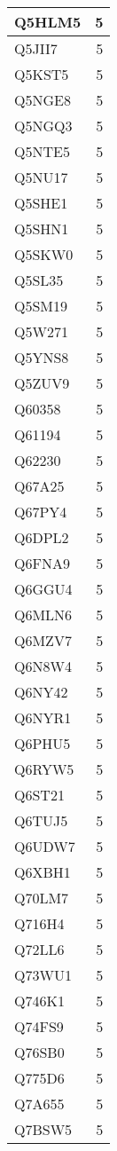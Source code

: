 \documentclass[
]{book}
\theoremstyle{definition}
\theoremstyle{definition}
\theoremstyle{definition}
\theoremstyle{definition}
\theoremstyle{remark}
\begin{document}
\begin{table}
\begin{tabular}{l|r}
\hline
Q5HLM5 & 5\\
\hline
Q5JII7 & 5\\
\hline
Q5KST5 & 5\\
\hline
Q5NGE8 & 5\\
\hline
Q5NGQ3 & 5\\
\hline
Q5NTE5 & 5\\
\hline
Q5NU17 & 5\\
\hline
Q5SHE1 & 5\\
\hline
Q5SHN1 & 5\\
\hline
Q5SKW0 & 5\\
\hline
Q5SL35 & 5\\
\hline
Q5SM19 & 5\\
\hline
Q5W271 & 5\\
\hline
Q5YNS8 & 5\\
\hline
Q5ZUV9 & 5\\
\hline
Q60358 & 5\\
\hline
Q61194 & 5\\
\hline
Q62230 & 5\\
\hline
Q67A25 & 5\\
\hline
Q67PY4 & 5\\
\hline
Q6DPL2 & 5\\
\hline
Q6FNA9 & 5\\
\hline
Q6GGU4 & 5\\
\hline
Q6MLN6 & 5\\
\hline
Q6MZV7 & 5\\
\hline
Q6N8W4 & 5\\
\hline
Q6NY42 & 5\\
\hline
Q6NYR1 & 5\\
\hline
Q6PHU5 & 5\\
\hline
Q6RYW5 & 5\\
\hline
Q6ST21 & 5\\
\hline
Q6TUJ5 & 5\\
\hline
Q6UDW7 & 5\\
\hline
Q6XBH1 & 5\\
\hline
Q70LM7 & 5\\
\hline
Q716H4 & 5\\
\hline
Q72LL6 & 5\\
\hline
Q73WU1 & 5\\
\hline
Q746K1 & 5\\
\hline
Q74FS9 & 5\\
\hline
Q76SB0 & 5\\
\hline
Q775D6 & 5\\
\hline
Q7A655 & 5\\
\hline
Q7BSW5 & 5\\

\end{tabular}
\end{table}
\end{document}
